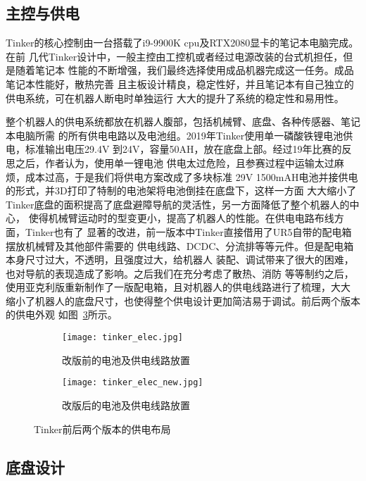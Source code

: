 \subsection{主控与供电}

Tinker的核心控制由一台搭载了i9-9900K cpu及RTX2080显卡的笔记本电脑完成。在前
几代Tinker设计中，一般主控由工控机或者经过电源改装的台式机担任，但是随着笔记本
性能的不断增强，我们最终选择使用成品机器完成这一任务。成品笔记本性能好，散热完善
且主板设计精良，稳定性好，并且笔记本有自己独立的供电系统，可在机器人断电时单独运行
大大的提升了系统的稳定性和易用性。

整个机器人的供电系统都放在机器人腹部，包括机械臂、底盘、各种传感器、笔记本电脑所需
的所有供电电路以及电池组。2019年Tinker使用单一磷酸铁锂电池供电，标准输出电压29.4V
到24V，容量50AH，放在底盘上部。经过19年比赛的反思之后，作者认为，使用单一锂电池
供电太过危险，且参赛过程中运输太过麻烦，成本过高，于是我们将供电方案改成了多块标准
29V 1500mAH电池并接供电的形式，并3D打印了特制的电池架将电池倒挂在底盘下，这样一方面
大大缩小了Tinker底盘的面积提高了底盘避障导航的灵活性，另一方面降低了整个机器人的中心，
使得机械臂运动时的型变更小，提高了机器人的性能。在供电电路布线方面，Tinker也有了
显著的改进，前一版本中Tinker直接借用了UR5自带的配电箱摆放机械臂及其他部件需要的
供电线路、DCDC、分流排等等元件。但是配电箱本身尺寸过大，不透明，且强度过大，给机器人
装配、调试带来了很大的困难，也对导航的表现造成了影响。之后我们在充分考虑了散热、消防
等等制约之后，使用亚克利版重新制作了一版配电箱，且对机器人的供电线路进行了梳理，大大
缩小了机器人的底盘尺寸，也使得整个供电设计更加简洁易于调试。前后两个版本的供电外观
如图~\ref{fig:elec}所示。

\begin{figure}
\centering
\begin{subfigure}{.5\textwidth}
  \centering
  \texttt{[image: tinker\_elec.jpg]}
  \caption{改版前的电池及供电线路放置}
  \label{fig:old_elec}
\end{subfigure}%
\begin{subfigure}{.5\textwidth}
  \centering
  \texttt{[image: tinker\_elec\_new.jpg]}
  \caption{改版后的电池及供电线路放置}
  \label{fig:new_elec}
\end{subfigure}
\caption{Tinker前后两个版本的供电布局}
\label{fig:elec}
\end{figure}

\subsection{底盘设计}

